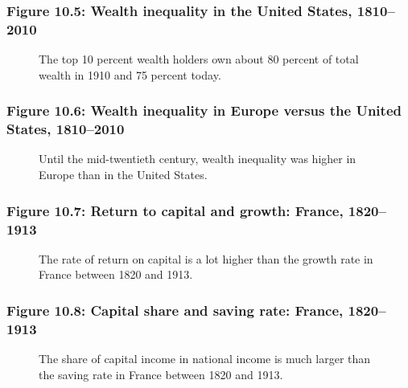 \documentclass[t]{beamer}\usepackage[]{graphicx}\usepackage[]{color}
\begin{document}
\begin{frame}[label=Figure_10_5]
\frametitle{Figure 10.5: Wealth inequality in the United States, 1810--2010}
\begin{figure}[t]
\begin{minipage}[b]{\textwidth}
\centering

\caption{The top 10 percent wealth holders own about 80 percent of total wealth in 1910 and 75 percent today.}
\end{minipage}
\end{figure}
\end{frame}


\begin{frame}[label=Figure_10_6]
\frametitle{Figure 10.6: Wealth inequality in Europe versus the United States, 1810--2010}
\begin{figure}[t]
\begin{minipage}[b]{\textwidth}
\centering

\caption{Until the mid-twentieth century, wealth inequality was higher in Europe than in the United States.}
\end{minipage}
\end{figure}
\end{frame}


\begin{frame}[label=Figure_10_7]
\frametitle{Figure 10.7: Return to capital and growth: France, 1820--1913}
\begin{figure}[t]
\begin{minipage}[b]{\textwidth}
\centering

\caption{The rate of return on capital is a lot higher than the growth rate in France between 1820 and 1913.}
\end{minipage}
\end{figure}
\end{frame}


\begin{frame}[label=Figure_10_8]
\frametitle{Figure 10.8: Capital share and saving rate: France, 1820--1913}
\begin{figure}[t]
\begin{minipage}[b]{\textwidth}
\centering

\caption{The share of capital income in national income is much larger than the saving rate in France between 1820 and 1913.}
\end{minipage}
\end{figure}
\end{frame}
\end{document}
